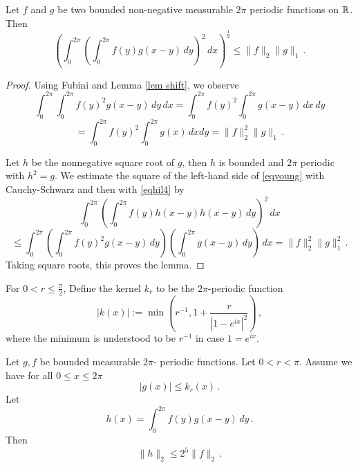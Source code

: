 \begin{lemma}\label{young}
    Let $f$ and $g$ be two bounded non-negative measurable $2\pi$ periodic functions on $\mathbb{R}$. Then
    \begin{equation}\label{eqyoung}
        \left(\int_0^{2\pi} \left(\int_0^{2\pi}
        f(y)g(x-y)\, dy\right)^2\, dx\right)^{\frac 12}\le \|f\|_2 \|g\|_1\, .
    \end{equation}
    \end{lemma}
\begin{proof}
Using Fubini and Lemma \ref{lem shift}, we observe
\begin{equation*}
    \int_0^{2\pi}\int_0^{2\pi}f(y)^2g(x-y)\, dy
    \, dx=\int_0^{2\pi}f(y)^2\int_0^{2\pi}g(x-y)\, dx
    \, dy
\end{equation*}
\begin{equation}\label{eqhil4}
=\int_0^{2\pi}f(y)^2\int_0^{2\pi}g(x) \, dx
        dy
=\|f\|_2^2\|g\|_1\, .
\end{equation}

    Let $h$ be the  nonnegative square root of $g$, then
    $h$ is bounded and $2\pi$ periodic with $h^2=g$.
    We estimate the square of the left-hand side of
    \eqref{eqyoung} with Cauchy-Schwarz and then with
    \eqref{eqhil4} by
        \begin{equation*}
            \int_0^{2\pi} (\int_0^{2\pi}f(y)h(x-y)h(x-y)\, dy)^2\, dx
    \end{equation*}
\begin{equation}
    \le \int_0^{2\pi}\left(\int_0^{2\pi}f(y)^2g(x-y)\, dy\right)
    \left(\int_0^{2\pi}g(x-y)\, dy\right)\, dx
    = \|f\|_2^2\|g\|_1^2\, .
\end{equation}
Taking square roots, this proves the lemma.
\end{proof}

For $0<r\le \frac \pi 2$, Define the kernel $k_r$ to be the $2\pi$-periodic function
\begin{equation}
    |k(x)|:=\min \left(r^{-1}, 1+\frac r{|1-e^{ix}|^2}\right)\, ,
\end{equation}
where the minimum is understood to be $r^{-1}$ in case $1=e^{ix}$.
\begin{lemma}\label{krbound}
Let $g,f$ be bounded measurable $2\pi$-
periodic functions. Let $0<r<\pi$.
Assume we have for all $0\le x\le 2\pi$
\begin{equation}
    |g(x)|\le k_r(x)\, .
\end{equation}
Let
\begin{equation}
    h(x)= \int_0^{2\pi} f(y)g(x-y)\, dy \, .
\end{equation}
Then
\begin{equation}
    \|h\|_2\le 2^{5}\|f\|_2  \, .
\end{equation}

\end{lemma}

